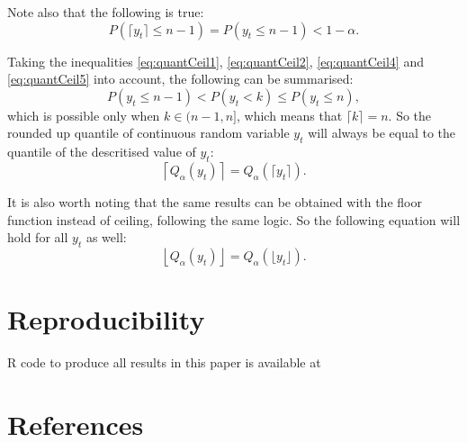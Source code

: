 \documentclass[]{elsarticle} %
\begin{document}
Note also that the following is true:
\begin{equation} \label{eq:quantCeil5}
    P \left(\lceil y_t \rceil \leq n-1 \right) = P \left(y_t \leq n-1 \right) < 1 - \alpha .
\end{equation}

Taking the inequalities \eqref{eq:quantCeil1}, \eqref{eq:quantCeil2},
\eqref{eq:quantCeil4} and \eqref{eq:quantCeil5} into account, the
following can be summarised: \begin{equation} \label{eq:quantCeil6}
    P \left(y_t \leq n-1 \right) < P \left(y_t < k \right) \leq P \left(y_t \leq n \right) ,
\end{equation} which is possible only when \(k \in (n-1, n]\), which means
that \(\lceil k \rceil = n\). So the rounded up quantile of continuous
random variable \(y_t\) will always be equal to the quantile of the
descritised value of \(y_t\):
\begin{equation} \label{eq:ceilingAndQuantiles1}
    \left \lceil Q_\alpha(y_t) \right \rceil = Q_\alpha \left(\lceil y_t \rceil \right) .
\end{equation}

It is also worth noting that the same results can be obtained with the
floor function instead of ceiling, following the same logic. So the
following equation will hold for all \(y_t\) as well:
\begin{equation} \label{eq:floorAndQuantiles1}
    \left \lfloor Q_\alpha(y_t) \right \rfloor = Q_\alpha \left(\lfloor y_t \rfloor \right) .
\end{equation}

\hypertarget{reproducibility}{%
\section*{Reproducibility}\label{reproducibility}}

R code to produce all results in this paper is available at

\hypertarget{references}{%
\section*{References}\label{references}}
\end{document}
